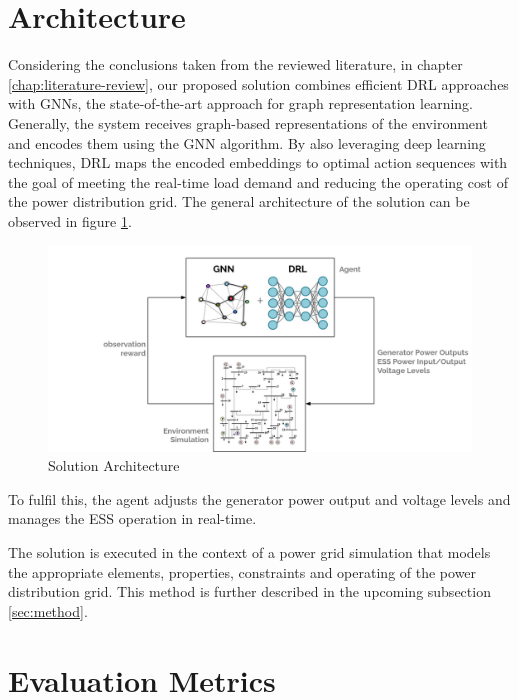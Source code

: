 \section{Architecture} \label{sec:arch}

Considering the conclusions taken from the reviewed literature, in chapter \ref{chap:literature-review}, our proposed solution combines efficient \acf{DRL} approaches with \acfp{GNN}, the state-of-the-art approach for graph representation learning. Generally, the system receives graph-based representations of the environment and encodes them using the \ac{GNN} algorithm. By also leveraging deep learning techniques, \ac{DRL} maps the encoded embeddings to optimal action sequences with the goal of meeting the real-time load demand and reducing the operating cost of the power distribution grid. The general architecture of the solution can be observed in figure \ref{fig:arch}.

\begin{figure}
	\centering
	\includegraphics[width=0.85\linewidth]{./figures/arch.png}
	\caption{Solution Architecture}
	\label{fig:arch}
\end{figure}


To fulfil this, the agent adjusts the generator power output and voltage levels and manages the \ac{ESS} operation in real-time. \par
The solution is executed in the context of a power grid simulation that models the appropriate elements, properties, constraints and operating of the power distribution grid. This method is further described in the upcoming subsection \ref{sec:method}.



\section{Evaluation Metrics} \label{sec:eval-methods}

